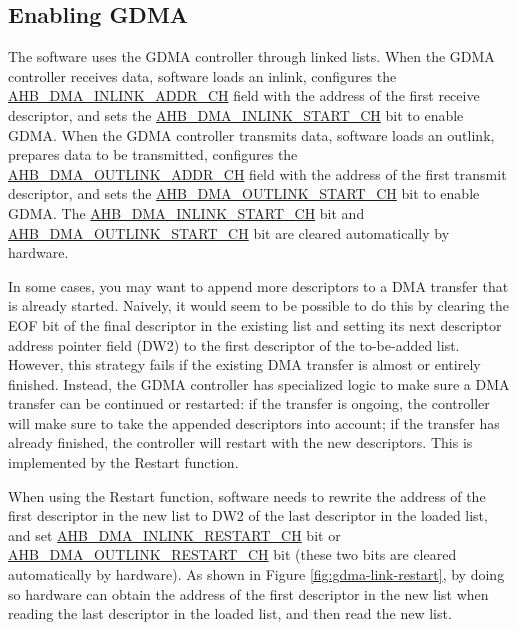 \documentclass[main\_\_EN.tex]{subfiles}
\begin{document}
\subsection{Enabling GDMA}

The software uses the GDMA controller through linked lists. When the GDMA controller receives data, software loads an inlink, configures the \hyperref[fielddesc:AHBDMAINLINKADDRCHN]{AHB\_DMA\_INLINK\_ADDR\_CH} field with the address of the first receive descriptor, and sets the \hyperref[fielddesc:AHBDMAINLINKSTARTCHN]{AHB\_DMA\_INLINK\_START\_CH} bit to enable GDMA. When the GDMA controller transmits data, software loads an outlink, prepares data to be transmitted, configures the \hyperref[fielddesc:AHBDMAOUTLINKADDRCHN]{AHB\_DMA\_OUTLINK\_ADDR\_CH} field with the address of the first transmit descriptor, and sets the \hyperref[fielddesc:AHBDMAOUTLINKSTARTCHN]{AHB\_DMA\_OUTLINK\_START\_CH} bit to enable GDMA. The \hyperref[fielddesc:AHBDMAINLINKSTARTCHN]{AHB\_DMA\_INLINK\_START\_CH} bit and \hyperref[fielddesc:AHBDMAOUTLINKSTARTCHN]{AHB\_DMA\_OUTLINK\_START\_CH} bit are cleared automatically by hardware.

In some cases, you may want to append more descriptors to a DMA transfer that is already started. Naively, it would seem to be possible to do this by clearing the EOF bit of the final descriptor in the existing list and setting its next descriptor address pointer field (DW2) to the first descriptor of the to-be-added list. However, this strategy fails if the existing DMA transfer is almost or entirely finished. Instead, the GDMA controller has specialized logic to make sure a DMA transfer can be continued or restarted: if the transfer is ongoing, the controller will make sure to take the appended descriptors into account; if the transfer has already finished, the controller will restart with the new descriptors. This is implemented by the Restart function.

When using the Restart function, software needs to rewrite the address of the first descriptor in the new list to DW2 of the last descriptor in the loaded list, and set \hyperref[fielddesc:AHBDMAINLINKRESTARTCHN]{AHB\_DMA\_INLINK\_RESTART\_CH} bit or \hyperref[fielddesc:AHBDMAOUTLINKRESTARTCHN]{AHB\_DMA\_OUTLINK\_RESTART\_CH} bit (these two bits are cleared automatically by hardware). As shown in Figure \ref{fig:gdma-link-restart}, by doing so hardware can obtain the address of the first descriptor in the new list when reading the last descriptor in the loaded list, and then read the new list.
\end{document}
